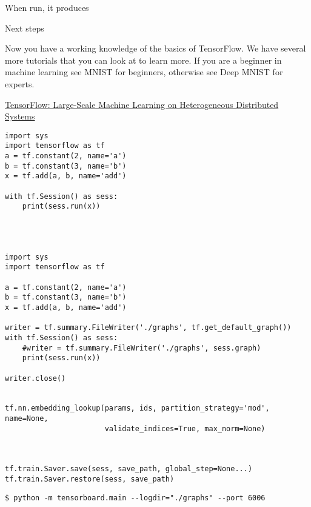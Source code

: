 
When run, it produces


Next steps

Now you have a working knowledge of the basics of TensorFlow. We have several more tutorials that you can look at to learn more. If you are a beginner in machine learning see MNIST for beginners, otherwise see Deep MNIST for experts.


\href{https://arxiv.org/abs/1603.04467}{TensorFlow: Large-Scale Machine Learning on Heterogeneous Distributed Systems}

\begin{verbatim}
import sys
import tensorflow as tf
a = tf.constant(2, name='a')
b = tf.constant(3, name='b')
x = tf.add(a, b, name='add')

with tf.Session() as sess:
    print(sess.run(x))




import sys
import tensorflow as tf

a = tf.constant(2, name='a')
b = tf.constant(3, name='b')
x = tf.add(a, b, name='add')

writer = tf.summary.FileWriter('./graphs', tf.get_default_graph())
with tf.Session() as sess:
    #writer = tf.summary.FileWriter('./graphs', sess.graph)
    print(sess.run(x))

writer.close()


tf.nn.embedding_lookup(params, ids, partition_strategy='mod', name=None,
                       validate_indices=True, max_norm=None)



tf.train.Saver.save(sess, save_path, global_step=None...)
tf.train.Saver.restore(sess, save_path)
\end{verbatim}

\begin{verbatim}
$ python -m tensorboard.main --logdir="./graphs" --port 6006
\end{verbatim}

\ifx\engineeringnotes\undefined
    
\fi
